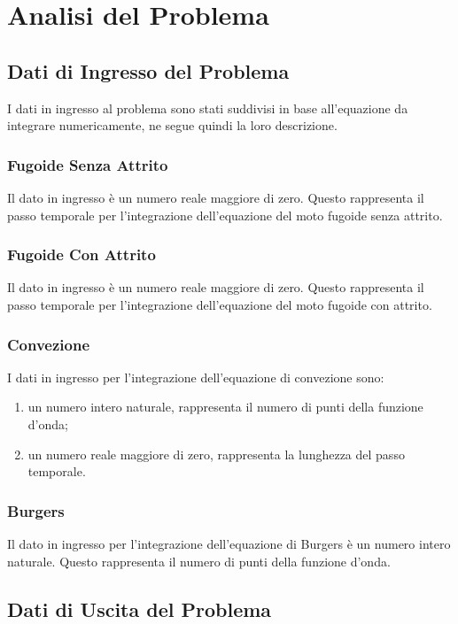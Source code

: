 \section{Analisi del Problema}

\subsection{Dati di Ingresso del Problema}

I dati in ingresso al problema sono stati suddivisi in base all'equazione da integrare numericamente, ne segue quindi la loro descrizione.

\subsubsection*{Fugoide Senza Attrito}
Il dato in ingresso è un numero reale maggiore di zero.
Questo rappresenta il passo temporale per l'integrazione dell'equazione del moto fugoide senza attrito.
\subsubsection*{Fugoide Con Attrito}
Il dato in ingresso è un numero reale maggiore di zero. Questo rappresenta il passo temporale per l'integrazione dell'equazione del moto fugoide con attrito.
\subsubsection*{Convezione}
    I dati in ingresso per l'integrazione dell'equazione di convezione sono:
    \begin{enumerate}
        \item un numero intero naturale, rappresenta il numero di punti della funzione d'onda;
        \item un numero reale maggiore di zero, rappresenta la lunghezza del passo temporale.
    \end{enumerate}
\subsubsection*{Burgers}
Il dato in ingresso per l'integrazione dell'equazione di Burgers è un numero intero naturale. Questo rappresenta il numero di punti della funzione d'onda.

\subsection{Dati di Uscita del Problema}

